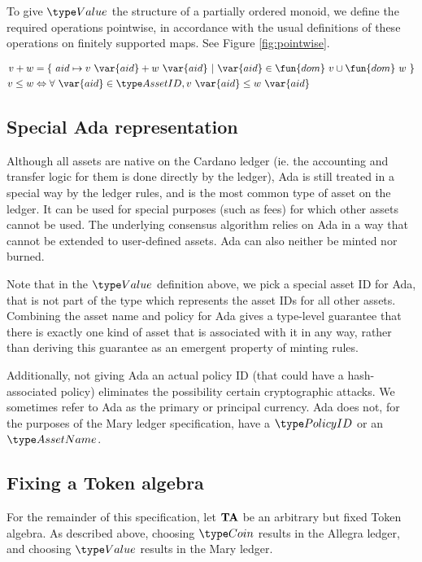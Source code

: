 To give $\Value$ the structure of a partially ordered monoid, we define the
required operations
pointwise, in accordance with the usual definitions of these operations on
finitely supported maps. See Figure \ref{fig:pointwise}.

\begin{figure*}[t!]
  \begin{align*}
    v + w    &= \{~ aid \mapsto v~\var{aid} + w~\var{aid} ~\vert~ \var{aid} \in \fun{dom}~v \cup \fun{dom}~w ~\} \\
    v \leq w &\Leftrightarrow \forall~\var{aid} \in \AssetID, v~\var{aid} \leq w~\var{aid}
  \end{align*}
  \caption{Pointwise operations on Value}
  \label{fig:pointwise}
\end{figure*}

\subsection{Special Ada representation}
Although all assets are native on the Cardano ledger (ie. the accounting and
transfer logic for them is done directly by the ledger), Ada is still treated in a
special way by the ledger rules, and is the most common type of asset on the ledger.
It can
be used for special purposes (such as fees) for which other assets cannot be used.
The underlying consensus algorithm relies on Ada in a way that
cannot be extended to user-defined assets.
Ada can also neither be minted nor burned.

Note that in the $\Value$ definition above, we pick a special asset ID for Ada, that
is not part of the type which represents the asset IDs for all other assets.
Combining the asset name and policy for Ada gives a type-level guarantee that there is exactly
one kind of asset that is associated with it in any way, rather than
deriving this guarantee as an emergent property of minting rules.

Additionally, not giving Ada an actual policy ID
(that could have a hash-associated policy) eliminates the possibility
certain cryptographic attacks.
We sometimes refer to Ada as the primary or principal currency. Ada does not,
for the purposes of the Mary ledger specification, have a $\PolicyID$ or an $\AssetName$.

\subsection{Fixing a Token algebra}

For the remainder of this specification, let $\mathbf{TA}$ be an
arbitrary but fixed Token algebra. As described above, choosing
$\Coin$ results in the Allegra ledger, and choosing $\Value$ results
in the Mary ledger.
